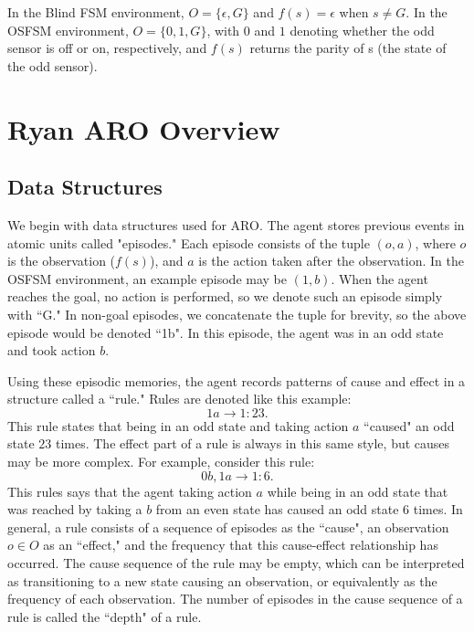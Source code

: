 \documentclass[letterpaper]{article} %
\begin{document}
In the Blind FSM environment, $O = \{\epsilon, G\}$ and $f(s) = \epsilon$ when $s \neq G$. In the OSFSM environment, $O = \{0, 1, G\}$, with $0$ and $1$ denoting whether the odd sensor is off or on, respectively, and $f(s)$ returns the parity of s (the state of the odd sensor).

\section{Ryan ARO Overview}


\subsection{Data Structures}

We begin with data structures used for ARO. The agent stores previous events in atomic units called "episodes." Each episode consists of the tuple $(o, a)$, where $o$ is the observation ($f(s)$), and $a$ is the action taken after the observation. In the OSFSM environment, an example episode may be $(1,b)$. When the agent reaches the goal, no action is performed, so we denote such an episode simply with ``G." In non-goal episodes, we concatenate the tuple for brevity, so the above episode would be denoted ``1b". In this episode, the agent was in an odd state and took action $b$.

Using these episodic memories, the agent records patterns of cause and effect in a structure called a ``rule." Rules are denoted like this example: $$1a \rightarrow 1: 23.$$ This rule states that being in an odd state and taking action $a$ ``caused" an odd state $23$ times. The effect part of a rule is always in this same style, but causes may be more complex. For example, consider this rule: $$0b,1a \rightarrow 1: 6.$$ This rules says that the agent taking action $a$ while being in an odd state that was reached by taking a $b$ from an even state has caused an odd state $6$ times. In general, a rule consists of a sequence of episodes as the ``cause", an observation $o \in O$ as an ``effect," and the frequency that this cause-effect relationship has occurred. The cause sequence of the rule may be empty, which can be interpreted as transitioning to a new state causing an observation, or equivalently as the frequency of each observation. The number of episodes in the cause sequence of a rule is called the ``depth" of a rule.
\end{document}

